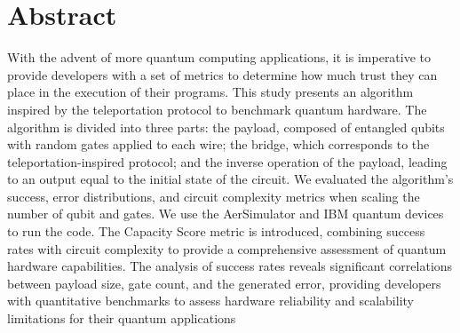 \section*{Abstract}


With the advent of more quantum computing applications, it is imperative to provide developers with a set of metrics to determine how much trust they can place in the execution of their programs. This study presents an algorithm inspired by the teleportation protocol to benchmark quantum hardware. The algorithm is divided into three parts: the payload, composed of entangled qubits with random gates applied to each wire; the bridge, which corresponds to the teleportation-inspired protocol; and the inverse operation of the payload, leading to an output equal to the initial state of the circuit. We evaluated the algorithm's success, error distributions, and circuit complexity metrics when scaling the number of qubit and gates. We use the AerSimulator and IBM quantum devices to run the code. The Capacity Score metric is introduced, combining success rates with circuit complexity to provide a comprehensive assessment of quantum hardware capabilities. The analysis of success rates reveals significant correlations between payload size, gate count, and the generated error, providing developers with quantitative benchmarks to assess hardware reliability and scalability limitations for their quantum applications

